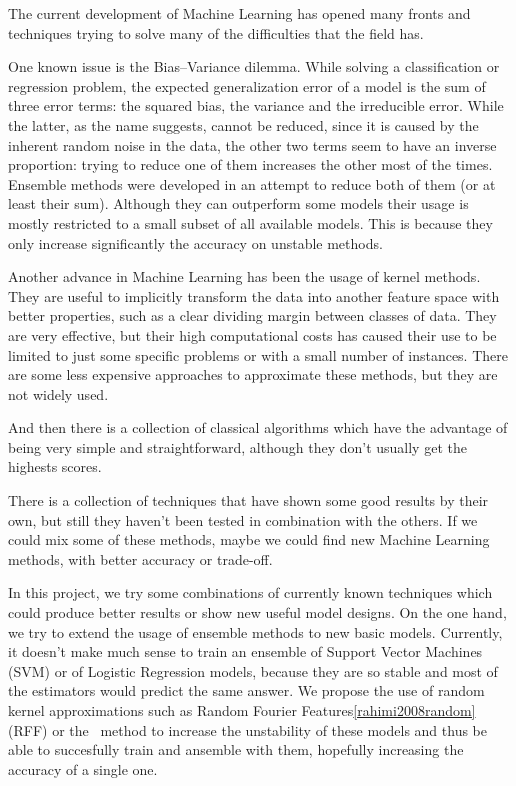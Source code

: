 \begin{pre-delivery}
  The current development of Machine Learning has opened many fronts and
  techniques trying to solve many of the difficulties that the field has.

  One known issue is the Bias--Variance dilemma\cite{domingos2000unified}. While solving a classification
  or regression problem, the expected generalization error of a model is the
  sum of three error terms: the squared bias, the variance and the irreducible error.
  While the latter, as the name suggests, cannot be reduced, since it is
  caused by the inherent random noise in the data, the other two terms seem
  to have an inverse proportion: trying to reduce one of them increases the
  other most of the times.
  Ensemble methods\cite{polikar2006ensemble} were developed in an attempt to reduce both of them (or at
  least their sum).
  Although they can outperform some models
  their usage is mostly restricted to a small subset of all available models.
  This is because they only increase significantly the accuracy on unstable
  methods.

  Another advance in Machine Learning has been the usage of kernel methods\cite{Cortes1995}. They
  are useful to implicitly transform the data into another feature space with better properties,
  such as a clear dividing margin between classes of data. They are very
  effective, but their high computational costs has caused their use to be limited to just
  some specific problems or with a small number of instances. There are some
  less expensive approaches to approximate these methods, but they are not
  widely used\cite{rahimi2008random}\cite{NIPS2000_1866}.

  And then there is a collection of classical algorithms which have the
  advantage of being very simple and straightforward, although they don't
  usually get the highests scores.

  There is a collection of techniques that have shown some good results by their
  own, but still they haven't been tested in combination with the others. If we
  could mix some of these methods, maybe we could find new Machine Learning
  methods, with better accuracy or trade-off.

  In this project, we try some combinations of currently known techniques which
  could produce better results or show new useful model designs. On the one
  hand, we try to extend the usage of ensemble methods to new basic models.
  Currently, it doesn't make much sense to train an ensemble of Support Vector
  Machines (SVM) or of Logistic Regression models, because they are so stable and
  most of the estimators would predict the same answer. We propose the use of
  random kernel approximations such as Random Fourier Features\ref{rahimi2008random} (RFF) or the
  \Nys\ method\cite{NIPS2000_1866} to increase the unstability of these models and thus be able to
  succesfully train and ansemble with them, hopefully increasing the accuracy
  of a single one.


\end{pre-delivery}
